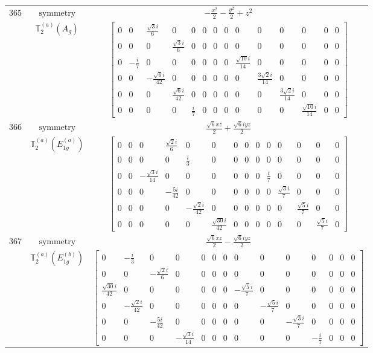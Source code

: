 \documentclass[fleqn,8pt,landscape]{jsarticle}
\begin{document}
\begin{longtable}{ccc}
$ 365 $ & $ \text{symmetry} $ & $ - \frac{x^{2}}{2} - \frac{y^{2}}{2} + z^{2} $ \\
$  $ & $ \mathbb{T}_{2}^{(a)}(A_{g}) $ & $ \begin{bmatrix} 0 & 0 & \frac{\sqrt{3} i}{6} & 0 & 0 & 0 & 0 & 0 & 0 & 0 & 0 & 0 & 0 & 0 \\ 0 & 0 & 0 & \frac{\sqrt{3} i}{6} & 0 & 0 & 0 & 0 & 0 & 0 & 0 & 0 & 0 & 0 \\ 0 & - \frac{i}{7} & 0 & 0 & 0 & 0 & 0 & 0 & \frac{\sqrt{10} i}{14} & 0 & 0 & 0 & 0 & 0 \\ 0 & 0 & - \frac{\sqrt{6} i}{42} & 0 & 0 & 0 & 0 & 0 & 0 & \frac{3 \sqrt{2} i}{14} & 0 & 0 & 0 & 0 \\ 0 & 0 & 0 & \frac{\sqrt{6} i}{42} & 0 & 0 & 0 & 0 & 0 & 0 & \frac{3 \sqrt{2} i}{14} & 0 & 0 & 0 \\ 0 & 0 & 0 & 0 & \frac{i}{7} & 0 & 0 & 0 & 0 & 0 & 0 & \frac{\sqrt{10} i}{14} & 0 & 0 \end{bmatrix} $ \\ \hline
$ 366 $ & $ \text{symmetry} $ & $ \frac{\sqrt{6} x z}{2} + \frac{\sqrt{6} i y z}{2} $ \\
$  $ & $ \mathbb{T}_{2}^{(a)}(E_{1g}^{(a)}) $ & $ \begin{bmatrix} 0 & 0 & 0 & \frac{\sqrt{2} i}{6} & 0 & 0 & 0 & 0 & 0 & 0 & 0 & 0 & 0 & 0 \\ 0 & 0 & 0 & 0 & \frac{i}{3} & 0 & 0 & 0 & 0 & 0 & 0 & 0 & 0 & 0 \\ 0 & 0 & - \frac{\sqrt{3} i}{14} & 0 & 0 & 0 & 0 & 0 & 0 & \frac{i}{7} & 0 & 0 & 0 & 0 \\ 0 & 0 & 0 & - \frac{5 i}{42} & 0 & 0 & 0 & 0 & 0 & 0 & \frac{\sqrt{3} i}{7} & 0 & 0 & 0 \\ 0 & 0 & 0 & 0 & - \frac{\sqrt{2} i}{42} & 0 & 0 & 0 & 0 & 0 & 0 & \frac{\sqrt{5} i}{7} & 0 & 0 \\ 0 & 0 & 0 & 0 & 0 & \frac{\sqrt{30} i}{42} & 0 & 0 & 0 & 0 & 0 & 0 & \frac{\sqrt{5} i}{7} & 0 \end{bmatrix} $ \\ \hline
$ 367 $ & $ \text{symmetry} $ & $ \frac{\sqrt{6} x z}{2} - \frac{\sqrt{6} i y z}{2} $ \\
$  $ & $ \mathbb{T}_{2}^{(a)}(E_{1g}^{(b)}) $ & $ \begin{bmatrix} 0 & - \frac{i}{3} & 0 & 0 & 0 & 0 & 0 & 0 & 0 & 0 & 0 & 0 & 0 & 0 \\ 0 & 0 & - \frac{\sqrt{2} i}{6} & 0 & 0 & 0 & 0 & 0 & 0 & 0 & 0 & 0 & 0 & 0 \\ \frac{\sqrt{30} i}{42} & 0 & 0 & 0 & 0 & 0 & 0 & - \frac{\sqrt{5} i}{7} & 0 & 0 & 0 & 0 & 0 & 0 \\ 0 & - \frac{\sqrt{2} i}{42} & 0 & 0 & 0 & 0 & 0 & 0 & - \frac{\sqrt{5} i}{7} & 0 & 0 & 0 & 0 & 0 \\ 0 & 0 & - \frac{5 i}{42} & 0 & 0 & 0 & 0 & 0 & 0 & - \frac{\sqrt{3} i}{7} & 0 & 0 & 0 & 0 \\ 0 & 0 & 0 & - \frac{\sqrt{3} i}{14} & 0 & 0 & 0 & 0 & 0 & 0 & - \frac{i}{7} & 0 & 0 & 0 \end{bmatrix} $ \\ \hline

\end{longtable}
\end{document}
